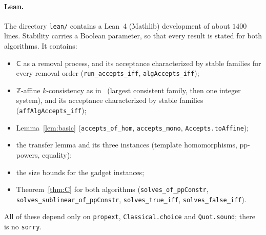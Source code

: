 \documentclass[11pt]{article}
\theoremstyle{definition}
\theoremstyle{remark}
\newcommand{\Coh}{\mathsf{C}}
\newcommand{\Z}{\mathbb Z}
\begin{document}
\paragraph{Lean.} The directory \texttt{lean/} contains a Lean~4 (Mathlib)
development of about $1400$ lines. Stability carries a Boolean parameter, so that
every result is stated for both algorithms. It contains:
\begin{itemize}
\item $\Coh$ as a removal process, and its acceptance characterized by stable
families for every removal order (\texttt{run\_accepts\_iff},
\texttt{algAccepts\_iff});
\item $\Z$-affine $k$-consistency as in~\cite{LP25} (largest consistent family,
then one integer system), and its acceptance characterized by stable families
(\texttt{affAlgAccepts\_iff});
\item Lemma~\ref{lem:basic} (\texttt{accepts\_of\_hom}, \texttt{accepts\_mono},
\texttt{Accepts.toAffine});
\item the transfer lemma and its three instances (template homomorphisms,
pp-powers, equality);
\item the size bounds for the gadget instances;
\item Theorem~\ref{thm:C} for both algorithms (\texttt{solves\_of\_ppConstr},
\texttt{solves\_sublinear\_of\_ppConstr}, \texttt{solves\_true\_iff},
\texttt{solves\_false\_iff}).
\end{itemize}
All of these depend only on \texttt{propext}, \texttt{Classical.choice} and
\texttt{Quot.sound}; there is no \texttt{sorry}.
\end{document}
